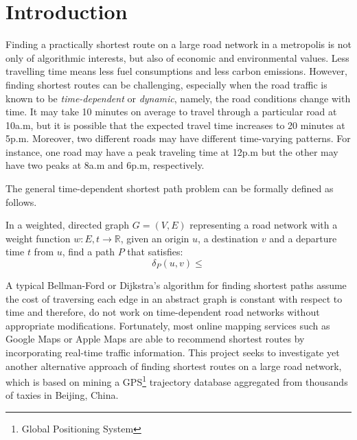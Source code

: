 \chapter{Introduction}

Finding a practically shortest route on a large road network in a metropolis is not only of algorithmic interests, but also of economic and environmental values. Less travelling time means less fuel consumptions and less carbon emissions. However, finding shortest routes can be challenging, especially when the road traffic is known to be \emph{time-dependent} or \emph{dynamic}, namely, the road conditions change with time. It may take 10 minutes on average to travel through a particular road at 10a.m, but it is possible that the expected travel time increases to 20 minutes at 5p.m. Moreover, two different roads may have different time-varying patterns. For instance, one road may have a peak traveling time at 12p.m but the other may have two peaks at 8a.m and 6p.m, respectively.

The general time-dependent shortest path problem can be formally defined as follows.
\begin{defn}
In a weighted, directed graph $G=(V,E)$ representing a road network with a weight function $w : E,t \rightarrow \mathbb{R}$, given an origin $u$, a destination $v$ and a departure time $t$ from $u$, find a path $P$ that satisfies:
\begin{equation}
\delta_P(u,v)\leq
\end{equation}
\end{defn}

A typical Bellman-Ford\cite{CLRS09} or Dijkstra's algorithm\cite{Dij59} for finding shortest paths assume the cost of traversing each edge in an abstract graph is constant with respect to time and therefore, do not work on time-de\-pendent road networks without appropriate modifications. Fortunately, most online mapping services such as Google Maps or Apple Maps are able to recommend shortest routes by incorporating real-time traffic information. This project seeks to investigate yet another alternative approach of finding shortest routes on a large road network, which is based on mining a GPS\footnote{Global Positioning System} trajectory database aggregated from thousands of taxies in Beijing, China.

